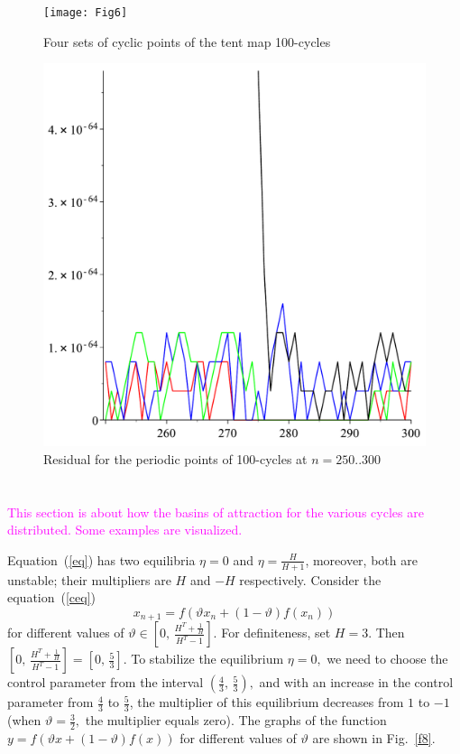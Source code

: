 \documentclass[12pt,a4paper]{amsart}
\begin{document}
\begin{figure}[h!]
\centering
\texttt{[image: Fig6]}
\caption{Four sets of cyclic points of the tent map 100-cycles} \label{f6}
\end{figure}

\begin{figure}[h!]
\centering
\includegraphics[scale=0.28]{Fig7}
\caption{Residual for the periodic points of 100-cycles at $n=250..300$} \label{f7}
\end{figure}

\section{}

\textcolor{magenta}{This section is about how the basins of attraction for the various cycles are distributed.  Some examples are visualized.}

Equation~(\ref{eq}) has two equilibria $\eta = 0$ and $\eta = \frac{H}{H+1}$, moreover, both are unstable; 
their multipliers are $H$ and $-H$ respectively. Consider the equation~(\ref{ceq})
$$
x_{n+1} = f \left( \vartheta x_n + (1 - \vartheta)f(x_n) \right)
$$
for different values of $\vartheta \in \left[0,\, \frac{H^T + \frac{1}{H}}{H^T-1}\right].$ For definiteness, set $H=3.$
Then $\left[0,\, \frac{H^T + \frac{1}{H}}{H^T-1}\right] = \left[ 0,\,\frac53\right].$ To stabilize the equilibrium $\eta=0,$
we need to choose the control parameter from the interval $\left(\frac43,\,\frac53\right),$ and with an increase 
in the control parameter from $\frac43$ to $\frac53$, the multiplier of this equilibrium decreases from $1$ to $-1$ 
(when $\vartheta=\frac32,$ the multiplier equals zero). The graphs of the function 
$y = f \left( \vartheta x + (1 - \vartheta)f(x) \right)$ for different values of $\vartheta$ are shown in Fig.~\ref{f8}.
\end{document}
